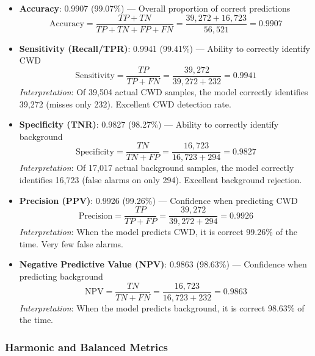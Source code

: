 \begin{itemize}
    \item \textbf{Accuracy}: 0.9907 (99.07\%) — Overall proportion of correct predictions
          \[
              \text{Accuracy} = \frac{TP + TN}{TP + TN + FP + FN} = \frac{39,272 + 16,723}{56,521} = 0.9907
          \]

    \item \textbf{Sensitivity (Recall/TPR)}: 0.9941 (99.41\%) — Ability to correctly identify CWD
          \[
              \text{Sensitivity} = \frac{TP}{TP + FN} = \frac{39,272}{39,272 + 232} = 0.9941
          \]
          \emph{Interpretation}: Of 39,504 actual CWD samples, the model correctly identifies 39,272
          (misses only 232). Excellent CWD detection rate.

    \item \textbf{Specificity (TNR)}: 0.9827 (98.27\%) — Ability to correctly identify background
          \[
              \text{Specificity} = \frac{TN}{TN + FP} = \frac{16,723}{16,723 + 294} = 0.9827
          \]
          \emph{Interpretation}: Of 17,017 actual background samples, the model correctly identifies 16,723
          (false alarms on only 294). Excellent background rejection.

    \item \textbf{Precision (PPV)}: 0.9926 (99.26\%) — Confidence when predicting CWD
          \[
              \text{Precision} = \frac{TP}{TP + FP} = \frac{39,272}{39,272 + 294} = 0.9926
          \]
          \emph{Interpretation}: When the model predicts CWD, it is correct 99.26\% of the time.
          Very few false alarms.

    \item \textbf{Negative Predictive Value (NPV)}: 0.9863 (98.63\%) — Confidence when predicting background
          \[
              \text{NPV} = \frac{TN}{TN + FN} = \frac{16,723}{16,723 + 232} = 0.9863
          \]
          \emph{Interpretation}: When the model predicts background, it is correct 98.63\% of the time.
\end{itemize}

\subsubsection{Harmonic and Balanced Metrics}

